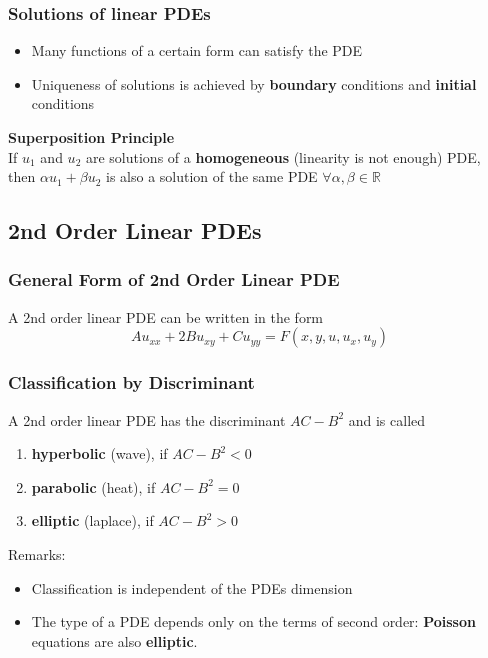 \subsubsection{Solutions of linear PDEs}
\begin{itemize}
    \item Many functions of a certain form can satisfy the PDE
    \item Uniqueness of solutions is achieved by \textbf{boundary} conditions and \textbf{initial} conditions
\end{itemize}
\vspace{5pt}
\textbf{Superposition Principle}\\
If $u_{1}$ and $u_{2}$ are solutions of a \textbf{homogeneous} (linearity is not enough) PDE, then $\alpha u_{1} + \beta u_{2}$ is also a solution of the same PDE $\forall \alpha , \beta \in \mathbb{R}$
%
%
%
\subsection{2nd Order Linear PDEs}
\subsubsection{General Form of 2nd Order Linear PDE}
A 2nd order linear PDE can be written in the form
\begin{equation} Au_{xx}+2Bu_{xy}+Cu_{yy}=F(x,y,u,u_x,u_y)\end{equation}
%
\subsubsection{Classification by Discriminant}
A 2nd order linear PDE has the discriminant $AC-B^2$ and is called
\begin{enumerate}
    \item \textbf{hyperbolic} (wave), if $AC-B^2<0$
    \item \textbf{parabolic} (heat), if $AC-B^2=0$
    \item \textbf{elliptic} (laplace), if $AC-B^2>0$
\end{enumerate}
\vspace{5pt}
Remarks:
\begin{itemize}
    \item Classification is independent of the PDEs dimension\vspace{5pt}
    \item The type of a PDE depends only on the terms of second order: \textbf{Poisson} equations are also \textbf{elliptic}.
\end{itemize}
%
%
%
